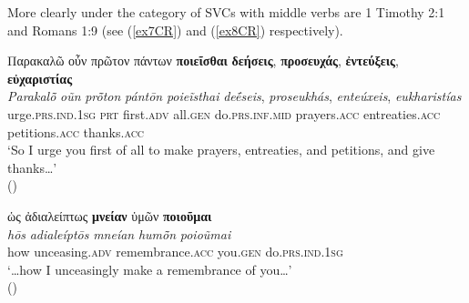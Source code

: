 \documentclass[output=paper,colorlinks,citecolor=brown]{langscibook}
\begin{document}
More clearly under the category of SVCs with middle verbs are 1 Timothy
2:1 and Romans 1:9 (see (\ref{ex7CR}) and (\ref{ex8CR}) respectively).

\ea\label{ex7CR} 
\glll Παρακαλῶ οὖν πρῶτον πάντων \textbf{\textbf{ποιεῖσθαι}} \textbf{δεήσεις}, \textbf{προσευχάς}, \textbf{ἐντεύξεις}, \textbf{εὐχαριστίας}\\
\textit{Parakalō̃} \textit{oũn} \textit{prō̃ton} \textit{pántōn} \textit{poieĩsthai} \textit{deḗseis}, \textit{proseukhás}, \textit{enteúxeis}, \textit{eukharistías}\\
    urge.\textsc{prs.ind.1sg} \textsc{prt} first.\textsc{adv} all.\textsc{gen} do.\textsc{prs.inf.mid} prayers.\textsc{acc} entreaties.\textsc{acc} petitions.\textsc{acc} thanks.\textsc{acc} \\

\glt `So I urge you first of all to make prayers, entreaties, and petitions, and give thanks\ldots{}' \\
\hspace*{\fill}()
\z


\ea\label{ex8CR} 
\glll ὡς ἀδιαλείπτως \textbf{μνείαν} ὑμῶν \textbf{ποιοῦμαι}\\
\textit{hōs} \textit{adialeíptōs} \textit{mneían} \textit{humō̃n} \textit{poioũmai}\\
    how unceasing.\textsc{adv} remembrance.\textsc{acc} you.\textsc{gen} do.\textsc{prs.ind.1sg} \\

\glt `\ldots how I unceasingly make a remembrance of you\ldots{}' \\
\hspace*{\fill}()
\z
\end{document}

